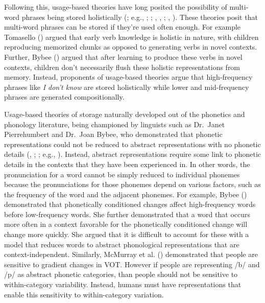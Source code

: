 \documentclass[
  12pt,
  letterpaper,
]{scrreprt}
\begin{document}
Following this, usage-based theories have long posited the possibility
of multi-word phrases being stored holistically
(; e.g.,
;
;
,
,
;
,
). These theories
posit that multi-word phrases can be stored if they're used often
enough. For example Tomasello
()
argued that early verb knowledge is holistic in nature, with children
reproducing memorized chunks as opposed to generating verbs in novel
contexts. Further, Bybee () argued that
after learning to produce these verbs in novel contexts, children don't
necessarily flush these holistic representations from memory. Instead,
proponents of usage-based theories argue that high-frequency phrases
like \emph{I don't know} are stored holistically while lower and
mid-frequency phrases are generated compositionally.

Usage-based theories of storage naturally developed out of the phonetics
and phonology literature, being championed by linguists such as
Dr.~Janet Pierrehumbert and Dr.~Joan Bybee, who demonstrated that
phonetic representations could not be reduced to abstract
representations with no phonetic details
(,
;
;
e.g.,
). Instead, abstract representations require some link to phonetic
details in the contexts that they have been experienced in. In other
words, the pronunciation for a word cannot be simply reduced to
individual phonemes because the pronunciations for those phonemes depend
on various factors, such as the frequency of the word and the adjacent
phonemes. For example, Bybee
() demonstrated that
phonetically conditioned changes affect high-frequency words before
low-frequency words. She further demonstrated that a word that occurs
more often in a context favorable for the phonetically conditioned
change will change more quickly. She argued that it is difficult to
account for these with a model that reduces words to abstract
phonological representations that are context-independent. Similarly,
McMurray et al.
() demonstrated
that people are sensitive to gradient changes in VOT. However if people
are representing /b/ and /p/ as abstract phonetic categories, than
people should not be sensitive to within-category variability. Instead,
humans must have representations that enable this sensitivity to
within-category variation.
\end{document}
